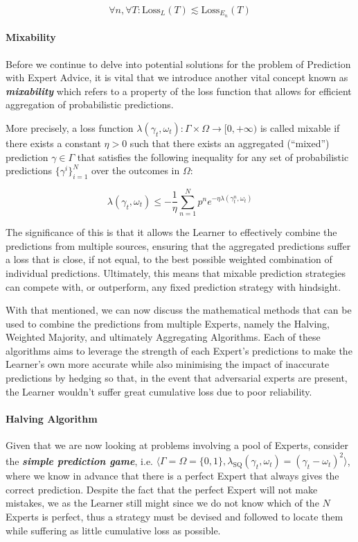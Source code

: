 \begin{equation}
    \forall n, \forall T: \text{Loss}_L(T) \lesssim \text{Loss}_{E_n}(T)
\end{equation}

\paragraph{Mixability}\label{paragaph:mixability}
Before we continue to delve into potential solutions for the problem of Prediction with Expert Advice, it is vital that we introduce another vital concept known as \textbf{\textit{mixability}} which refers to a property of the loss function that allows for efficient aggregation of probabilistic predictions.

More precisely, a loss function $\lambda(\gamma_t, \omega_t): \Gamma \times \Omega \rightarrow [0, +\infty)$ is called mixable if there exists a constant $\eta > 0$ such that there exists an aggregated (``mixed'') prediction $\gamma \in \Gamma$ that satisfies the following inequality for any set of probabilistic predictions $\{\gamma^i\}^N_{i=1}$ over the outcomes in $\Omega$:

\begin{equation}
    \lambda(\gamma_t, \omega_t) \leq - \frac{1}{\eta}\underset{n=1}{\overset{N}{\sum}} p^n e^{-\eta\lambda(\gamma^n_t, \omega_t)}
\end{equation}

The significance of this is that it allows the Learner to effectively combine the predictions from multiple sources, ensuring that the aggregated predictions suffer a loss that is close, if not equal, to the best possible weighted combination of individual predictions. Ultimately, this means that mixable prediction strategies can compete with, or outperform, any fixed prediction strategy with hindsight.

With that mentioned, we can now discuss the mathematical methods that can be used to combine the predictions from multiple Experts, namely the Halving, Weighted Majority, and ultimately Aggregating Algorithms. Each of these algorithms aims to leverage the strength of each Expert's predictions to make the Learner's own more accurate while also minimising the impact of inaccurate predictions by hedging so that, in the event that adversarial experts are present, the Learner wouldn't suffer great cumulative loss due to poor reliability.

\paragraph{Halving Algorithm}\label{paragraph:halving_algorithm}
Given that we are now looking at problems involving a pool of Experts, consider the \textbf{\textit{simple prediction game}}, i.e. $\langle \Gamma = \Omega = \{0, 1\}, \lambda_\text{SQ}(\gamma_t, \omega_t) = {(\gamma_t - \omega_t)}^2 \rangle$, where we know in advance that there is a perfect Expert that always gives the correct prediction. Despite the fact that the perfect Expert will not make mistakes, we as the Learner still might since we do not know which of the $N$ Experts is perfect, thus a strategy must be devised and followed to locate them while suffering as little cumulative loss as possible.

